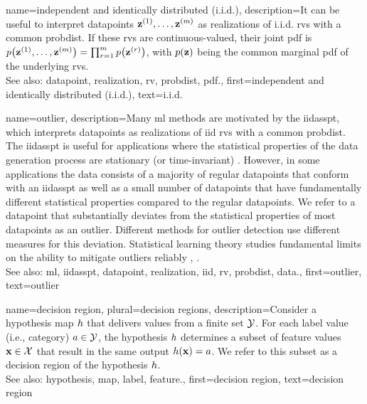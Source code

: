 {name={independent and identically distributed (i.i.d.)}, 
	description={It can be useful to 
		interpret \glspl{datapoint} ${\bf z}^{(1)}, \ldots, {\bf z}^{(m)}$ 
		as \glspl{realization} of i.i.d. \glspl{rv} with 
		a common \gls{probdist}. If these \glspl{rv} are continuous-valued, their joint \gls{pdf} 
		is $p\big({\bf z}^{(1)}, \ldots, {\bf z}^{(m)} \big) = \prod_{r=1}^{m} p \big({\bf z}^{(r)}\big)$, 
		with $p({\bf z})$ being the common 
		marginal \gls{pdf} of the underlying \glspl{rv}.
				\\
		See also: \gls{datapoint}, \gls{realization}, \gls{rv}, \gls{probdist}, \gls{pdf}.},
	first={independent and identically distributed (i.i.d.)},
	text={{i.i.d.}} 
}


{name={outlier}, 
	description={Many \gls{ml} methods 
		are motivated by the \gls{iidasspt}, which interprets \glspl{datapoint} as \glspl{realization} of 
		\gls{iid} \glspl{rv} with a common \gls{probdist}. The \gls{iidasspt} is useful for applications  
		where the statistical properties of the \gls{data} generation process are stationary (or time-invariant) \cite{Brockwell91}. 
		However, in some applications the \gls{data} consists of a majority of regular \glspl{datapoint} 
		that conform with an \gls{iidasspt} as well as a small number of \glspl{datapoint} that have fundamentally different 
       		statistical properties compared to the regular \glspl{datapoint}. We refer to a \gls{datapoint} that 
        		substantially deviates from the statistical properties of most \glspl{datapoint} as an 
        		outlier. Different methods for outlier detection use different measures for this deviation. 
        		Statistical learning theory studies fundamental limits on the ability to mitigate outliers reliably \cite{doi:10.1137/0222052}, \cite{10.1214/20-AOS1961}.
        		\\
		See also: \gls{ml}, \gls{iidasspt}, \gls{datapoint}, \gls{realization}, \gls{iid}, \gls{rv}, \gls{probdist}, \gls{data}.},
	 first={outlier},
	 text={outlier} 
}

{name={decision region}, plural={decision regions}, 
	description={Consider 
		a \gls{hypothesis} \gls{map} $h$ that delivers values from a finite set $\mathcal{Y}$. 
		For each \gls{label} value (i.e., category) $a \in \mathcal{Y}$, the \gls{hypothesis} $h$ 
		determines a subset of \gls{feature} values ${\bf x} \in \mathcal{X}$ that result 
		in the same output $h({\bf x})=a$. We refer to this subset as a decision 
		region of the \gls{hypothesis} $h$.
				\\
		See also: \gls{hypothesis}, \gls{map}, \gls{label}, \gls{feature}.},
	first={decision region},
	text={decision region} 
}


